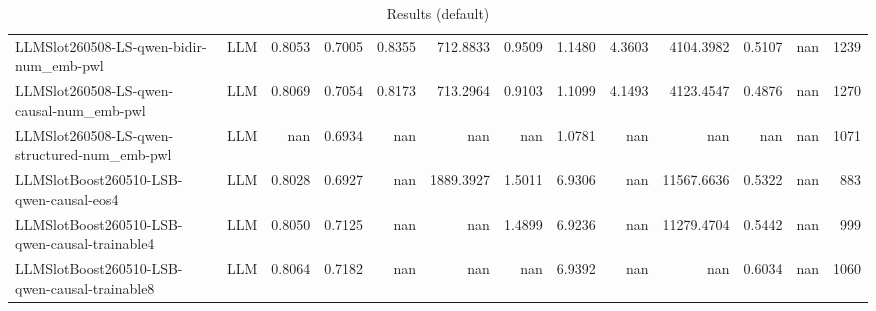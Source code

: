 \begin{table}[htbp]
{\begin{tabular}{ll|rrrrrrrrrr|r}
LLMSlot260508-LS-qwen-bidir-num\_emb-pwl & LLM & 0.8053 & 0.7005 & 0.8355 & 712.8833 & 0.9509 & 1.1480 & 4.3603 & 4104.3982 & 0.5107 & nan & 1239 \\
LLMSlot260508-LS-qwen-causal-num\_emb-pwl & LLM & 0.8069 & 0.7054 & 0.8173 & 713.2964 & 0.9103 & 1.1099 & 4.1493 & 4123.4547 & 0.4876 & nan & 1270 \\
LLMSlot260508-LS-qwen-structured-num\_emb-pwl & LLM & nan & 0.6934 & nan & nan & nan & 1.0781 & nan & nan & nan & nan & 1071 \\
LLMSlotBoost260510-LSB-qwen-causal-eos4 & LLM & 0.8028 & 0.6927 & nan & 1889.3927 & 1.5011 & 6.9306 & nan & 11567.6636 & 0.5322 & nan & 883 \\
LLMSlotBoost260510-LSB-qwen-causal-trainable4 & LLM & 0.8050 & 0.7125 & nan & nan & 1.4899 & 6.9236 & nan & 11279.4704 & 0.5442 & nan & 999 \\
LLMSlotBoost260510-LSB-qwen-causal-trainable8 & LLM & 0.8064 & 0.7182 & nan & nan & nan & 6.9392 & nan & nan & 0.6034 & nan & 1060 \\
\bottomrule
\end{tabular}
}
\caption{Results (default)}
\label{tab:results_default}
\end{table}